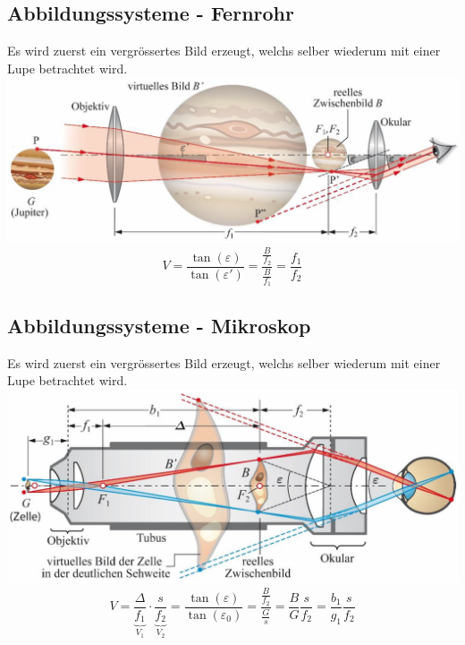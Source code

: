 \subsection{Abbildungssysteme - Fernrohr}

Es wird zuerst ein vergrössertes Bild erzeugt, welchs selber wiederum mit einer Lupe betrachtet wird. \\

\includegraphics[width=0.9\linewidth]{Bilder/Wellen-Optik/fernrohr} \\

$$ \boxed{ V = \frac{\tan(\varepsilon)}{\tan(\varepsilon')} = \frac{\frac{B}{f_2}}{\frac{B}{f_1} } = \frac{f_1}{f_2}  } $$




\subsection{Abbildungssysteme - Mikroskop}

Es wird zuerst ein vergrössertes Bild erzeugt, welchs selber wiederum mit einer Lupe betrachtet wird. \\

\includegraphics[width=0.9\linewidth]{Bilder/Wellen-Optik/mikroskop} \\

$$ \boxed{ V = \underbrace{\frac{\Delta}{f_1}}_{V_1} \cdot \underbrace{\frac{s}{f_2}}_{V_2} = \frac{\tan(\varepsilon)}{\tan(\varepsilon_0)} = \frac{\frac{B}{f_2}}{\frac{G}{s}} = \frac{B}{G} \frac{s}{f_2} = \frac{b_1}{g_1} \frac{s}{f_2} } $$


